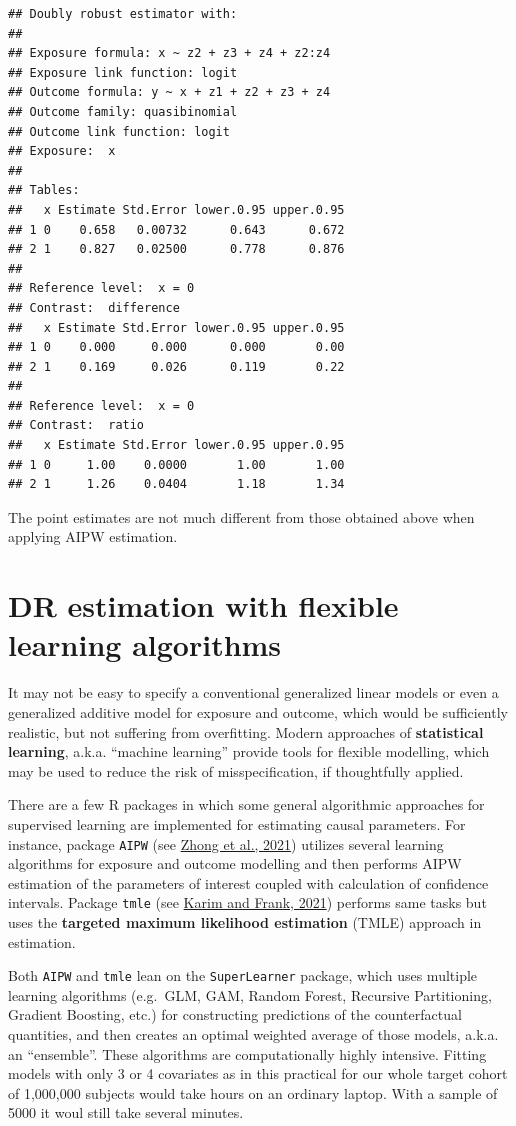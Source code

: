 \documentclass[
]{book}
\theoremstyle{definition}
\theoremstyle{definition}
\theoremstyle{definition}
\theoremstyle{definition}
\theoremstyle{remark}
\begin{document}
\begin{verbatim}
## Doubly robust estimator with: 
## 
## Exposure formula: x ~ z2 + z3 + z4 + z2:z4
## Exposure link function: logit 
## Outcome formula: y ~ x + z1 + z2 + z3 + z4
## Outcome family: quasibinomial 
## Outcome link function: logit 
## Exposure:  x 
## 
## Tables: 
##   x Estimate Std.Error lower.0.95 upper.0.95
## 1 0    0.658   0.00732      0.643      0.672
## 2 1    0.827   0.02500      0.778      0.876
## 
## Reference level:  x = 0 
## Contrast:  difference 
##   x Estimate Std.Error lower.0.95 upper.0.95
## 1 0    0.000     0.000      0.000       0.00
## 2 1    0.169     0.026      0.119       0.22
## 
## Reference level:  x = 0 
## Contrast:  ratio 
##   x Estimate Std.Error lower.0.95 upper.0.95
## 1 0     1.00    0.0000       1.00       1.00
## 2 1     1.26    0.0404       1.18       1.34
\end{verbatim}

The point estimates are not much different from those obtained above
when applying AIPW estimation.

\section{DR estimation with flexible learning algorithms}\label{dr-estimation-with-flexible-learning-algorithms}

It may not be easy to specify a conventional generalized linear models
or even a generalized additive model for exposure and outcome, which
would be
sufficiently realistic, but not suffering from overfitting. Modern
approaches of \textbf{statistical learning}, a.k.a. ``machine learning''
provide tools for flexible modelling, which may be used to reduce the
risk of misspecification, if thoughtfully applied.

There are a few R packages in which some general algorithmic approaches
for supervised learning are implemented for estimating causal
parameters. For instance, package \texttt{AIPW} (see \href{https://doi.org/10.1093/aje/kwab207}{Zhong et al.,
2021}) utilizes several learning
algorithms for exposure and outcome modelling and then performs AIPW
estimation of the parameters of interest coupled with calculation of
confidence intervals. Package \texttt{tmle} (see \href{https://ehsanx.github.io/TMLEworkshop/}{Karim and Frank,
2021}) performs same tasks but
uses the \textbf{targeted maximum likelihood estimation} (TMLE) approach in
estimation.

Both \texttt{AIPW} and \texttt{tmle} lean on the \texttt{SuperLearner} package, which uses
multiple learning algorithms (e.g.~GLM, GAM, Random Forest, Recursive
Partitioning, Gradient Boosting, etc.) for constructing predictions of
the counterfactual quantities, and then creates an optimal weighted
average of those models, a.k.a. an ``ensemble''. These algorithms are
computationally highly intensive. Fitting models with only 3 or 4
covariates as in this practical for our whole target cohort of 1,000,000
subjects would take hours on an ordinary laptop. With a sample of 5000
it woul still take several minutes.
\end{document}

